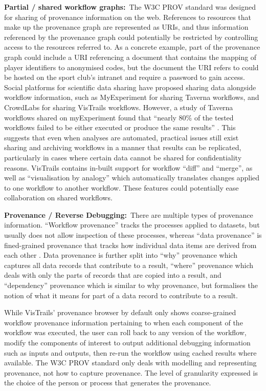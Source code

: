 {}

\textbf{Partial / shared workflow graphs:}{~The W3C PROV standard was designed
for sharing of provenance information on the web. References to
resources that make up the provenance graph are represented as }{URIs,
and thus information referenced by the provenance graph could
potentially be restricted by controlling access to the resources
referred to. As a concrete example, part of the provenance graph could
include a URI referencing a document that contains the mapping of player
identifiers to anonymised codes, but the document the URI refers to
could be hosted on the sport club's intranet and require a password to
gain access. Social platforms for scientific data sharing have proposed
sharing data alongside workflow information, such as MyExperiment
\cite{DeRoure2009} for sharing Taverna workflows, and CrowdLabs
\cite{Mates2011} for sharing VisTrails workflows. However, a study of
Taverna workflows shared on myExperiment found that ``nearly 80\% of the
tested workflows failed to be either executed or produce the same
results'' \cite{Zhao2012}. This suggests that even when analyses are automated, practical
issues still exist sharing and archiving workflows in a manner that results can be
replicated, particularly in cases where certain data cannot be shared
for confidentiality reasons. VisTrails contains in-built support for
workflow ``diff'' and ``merge'', as well as ``visualisation by analogy''
which automatically translates changes applied to one workflow to
another workflow. These features could potentially ease collaboration on
shared workflows.}

{}

\textbf{Provenance / Reverse Debugging:}{~There are multiple types of
provenance information. ``Workflow provenance'' tracks the processes
applied to datasets, but usually does not allow inspection of these
processes, whereas ``data provenance'' is fined-grained provenance that
tracks how individual data items are derived from each other
\cite{Tan2007}. Data provenance is further split into ``why'' provenance
\cite{Widom2000} which captures all data records that contribute to a
result, ``where'' provenance \cite{Buneman2001} which deals with only the
parts of records that are copied into a result, and ``dependency''
provenance \cite{Cheney2007}\cite{Cheney2011} which is similar to why
provenance, but formalises the notion of what it means for part of a
data record to contribute to a result.}

{}

{While VisTrails' provenance browser by default only shows
coarse-grained workflow provenance information pertaining to when each
component of the workflow was executed, the user can roll back to any
version of the workflow, modify the components of interest to output
additional debugging information such as inputs and outputs, then re-run
the workflow using cached results where available. The W3C PROV standard
only deals with modelling and representing provenance, not how to
capture provenance. The level of granularity expressed is the choice of
the person or process that generates the provenance.}

